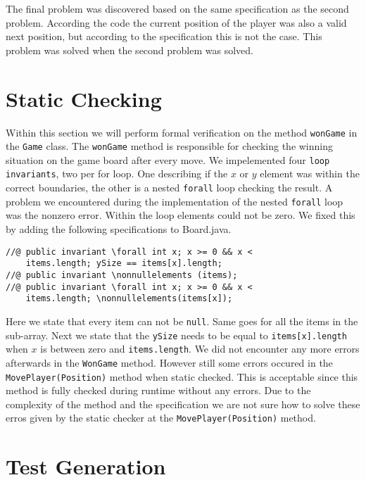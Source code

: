 \documentclass[a4paper]{article}
\begin{document}
	The final problem was discovered based on the same specification as the second problem. According the code the current position of the player was also a valid next position, but according to the specification this is not the case. This problem was solved when the second problem was solved.
	
	\newpage
	\section{Static Checking}
	\label{sec:staticchecking}
	Within this section we will perform formal verification on the method \texttt{wonGame} in the \texttt{Game} class. The \texttt{wonGame} method is responsible for checking the winning situation on the game board after every move.
	\newline 
	We impelemented four \texttt{loop invariants}, two per for loop. One describing if the $x$ or $y$ element was within the correct boundaries, the other is a nested \texttt{forall} loop checking the result. 
	A problem we encountered during the implementation of the nested \texttt{forall} loop was the nonzero error. Within the loop elements could not be zero. We fixed this by adding the following specifications to Board.java.
	\begin{lstlisting}
//@ public invariant \forall int x; x >= 0 && x <
    items.length; ySize == items[x].length;
//@ public invariant \nonnullelements (items);
//@ public invariant \forall int x; x >= 0 && x <
    items.length; \nonnullelements(items[x]);	
	\end{lstlisting}
	Here we state that every item can not be \texttt{null}. Same goes for all the items in the sub-array. Next we state that the \texttt{ySize} needs to be equal to \texttt{items[x].length} when $x$ is between zero and \texttt{items.length}. 
	\newline
	We did not encounter any more errors afterwards in the \texttt{WonGame} method. However still some errors occured in the \texttt{MovePlayer(Position)} method when static checked. This is acceptable since this method is fully checked during runtime without any errors. Due to the complexity of the method and the specification we are not sure how to solve these erros given by the static checker at the \texttt{MovePlayer(Position)} method.
	
	\section{Test Generation}
	
	
	
\end{document}
